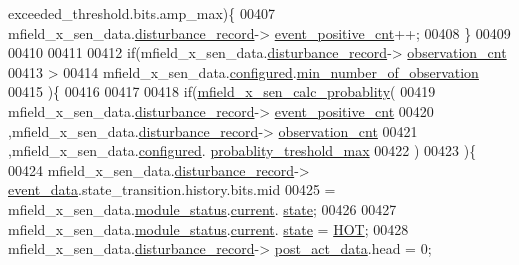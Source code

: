 \begin{DoxyCode}
      exceeded\_threshold.bits.amp\_max)\{
00407                  mfield\_x\_sen\_data.\hyperlink{a00025_ac9b38e2c1d3f1013a88d33506c754152}{disturbance\_record}->
      \hyperlink{a00028_a7397b9d76d4b57500f27bb23d258a18a}{event\_positive\_cnt}++;
00408            \}
00409 
00410 
00411 
00412                \textcolor{keywordflow}{if}(mfield\_x\_sen\_data.\hyperlink{a00025_ac9b38e2c1d3f1013a88d33506c754152}{disturbance\_record}->
      \hyperlink{a00028_ad5b0bac02ce266b91b2b52a1c3ea1d78}{observation\_cnt}
00413                 >
00414                 mfield\_x\_sen\_data.\hyperlink{a00025_a94b2d1f6ea4ab334c74d24984dd27843}{configured}.\hyperlink{a00021_ae8665e8bf422c1482442d6949ba28408}{min\_number\_of\_observation}
00415                )\{
00416 
00417 
00418                    \textcolor{keywordflow}{if}(\hyperlink{a00052_aeb1e6622fe9af5c31bd0d17ab01dd23a}{mfield\_x\_sen\_calc\_probablity}(
00419                            mfield\_x\_sen\_data.\hyperlink{a00025_ac9b38e2c1d3f1013a88d33506c754152}{disturbance\_record}->
      \hyperlink{a00028_a7397b9d76d4b57500f27bb23d258a18a}{event\_positive\_cnt}
00420                           ,mfield\_x\_sen\_data.\hyperlink{a00025_ac9b38e2c1d3f1013a88d33506c754152}{disturbance\_record}->
      \hyperlink{a00028_ad5b0bac02ce266b91b2b52a1c3ea1d78}{observation\_cnt}
00421                           ,mfield\_x\_sen\_data.\hyperlink{a00025_a94b2d1f6ea4ab334c74d24984dd27843}{configured}.
      \hyperlink{a00021_a7e2d217b9c9051d361319180a426851c}{probablity\_treshold\_max}
00422                            )
00423                     )\{
00424                          mfield\_x\_sen\_data.\hyperlink{a00025_ac9b38e2c1d3f1013a88d33506c754152}{disturbance\_record}->
      \hyperlink{a00028_a8c0bda69e71ef674e60da47ad0be9ab0}{event\_data}.state\_transition.history.bits.mid
00425                          = mfield\_x\_sen\_data.\hyperlink{a00025_adfab5a5d8b45a93dfb13edb24e2b80e3}{module\_status}.\hyperlink{a00019_acf41ffc11da291c2f9f0fcb02ee72b98}{current}.
      \hyperlink{a00019_a6b8d8e916bc56265a3fd279bd26b6d1b}{state};
00426 
00427                          mfield\_x\_sen\_data.\hyperlink{a00025_adfab5a5d8b45a93dfb13edb24e2b80e3}{module\_status}.\hyperlink{a00019_acf41ffc11da291c2f9f0fcb02ee72b98}{current}.
      \hyperlink{a00019_a6b8d8e916bc56265a3fd279bd26b6d1b}{state} = \hyperlink{a00021_a1eb14cc432874ddacd1934791dbe12a3}{HOT};
00428                          mfield\_x\_sen\_data.\hyperlink{a00025_ac9b38e2c1d3f1013a88d33506c754152}{disturbance\_record}->
      \hyperlink{a00028_a9c699c0cc82d0baa6e49195f185ab34f}{post\_act\_data}.head = 0;

\end{DoxyCode}
